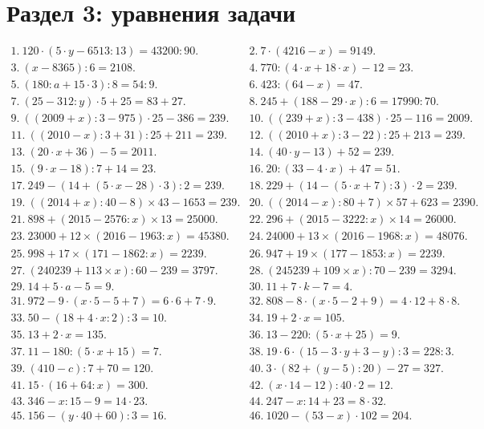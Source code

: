 \section{Раздел 3: уравнения задачи}
$\begin{array}{ll}
1.\ 120\cdot(5\cdot y-6513:13)=43200:90.&
2.\ 7\cdot(4216-x)=9149.\\
3.\ (x-8365):6=2108.&
4.\ 770:(4\cdot x+18\cdot x)-12=23.\\
5.\ (180:a+15\cdot3):8=54:9.&
6.\ 423:(64-x)=47.\\
7.\ (25-312:y)\cdot5+25=83+27.&
8.\ 245+(188-29\cdot x):6=17990:70.\\
9.\ ((2009+x):3-975)\cdot25-386=239.&
10.\ ((239+x):3-438)\cdot25-116=2009.\\
11.\ ((2010-x):3+31):25+211=239.&
12.\ ((2010+x):3-22):25+213=239.\\
13.\ (20\cdot x+36)-5=2011.&
14.\ (40\cdot y-13)+52=239.\\
15.\ (9\cdot x-18):7+14=23.&
16.\ 20:(33-4\cdot x)+47=51.\\
17.\ 249-(14+(5\cdot x-28)\cdot 3):2=239.&
18.\ 229+(14-(5\cdot x+7):3)\cdot2=239.\\
19.\ ((2014+x):40-8)\times43-1653=239.&
20.\ ((2014-x):80+7)\times57+623=2390.\\
21.\ 898+(2015-2576:x)\times 13=25000.&
22.\ 296+(2015-3222:x)\times 14=26000.\\
23.\ 23000+12\times (2016-1963:x)=45380.&
24.\ 24000+13\times(2016-1968:x)=48076.\\
25.\ 998+17\times(171-1862:x)=2239.&
26.\ 947+19\times(177-1853:x)=2239.\\
27.\ (240239+113\times x):60-239=3797.&
28.\ (245239+109\times x):70-239=3294.\\
29.\ 14+5\cdot a-5=9.&
30.\ 11+7\cdot k-7=4.\\
31.\ 972-9\cdot(x\cdot 5-5+7)=6\cdot6+7\cdot9.&
32.\ 808-8\cdot(x\cdot5-2+9)=4\cdot12+8\cdot8.\\
33.\ 50-(18+4\cdot x:2):3=10.&
34.\ 19+2\cdot x=105.\\
35.\ 13+2\cdot x=135.&
36.\ 13-220:(5\cdot x+25)=9.\\
37.\ 11-180:(5\cdot x+15)=7.&
38.\ 19\cdot6\cdot(15-3\cdot y+3-y):3=228:3.\\
39.\ (410-c):7+70=120.&
40.\ 3\cdot(82+(y-5):20)-27=327.\\
41.\ 15\cdot(16+64:x)=300.&
42.\ (x\cdot14-12):40\cdot2=12.\\
43.\ 346-x:15-9=14\cdot23.&
44.\ 247-x:14+23=8\cdot32.\\
45.\ 156-(y\cdot40+60):3=16.&
46.\ 1020-(53-x)\cdot102=204.\end{array}$\\
